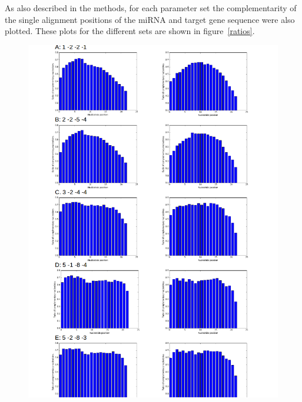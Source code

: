\documentclass[12pt]{article}
\begin{document}
As also described in the methods, for each parameter set the complementarity of the single alignment positions of the miRNA and target gene sequence were also plotted. These plots for the different sets are shown in figure~\ref{ratios}.

\begin{figure}
\vspace{-1cm}
\includegraphics[scale=0.65]{results/compl1.png}
\end{figure}
\end{document}
